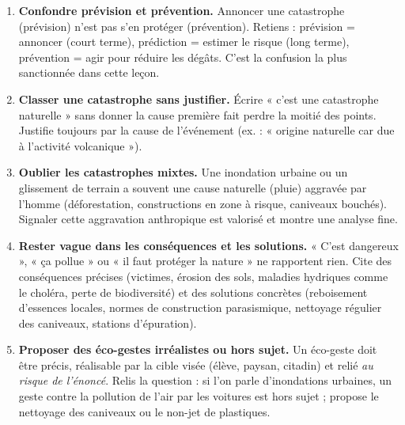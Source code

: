 \documentclass[11pt]{article}
\begin{document}
\begin{attention}
\begin{enumerate}
\item \textbf{Confondre prévision et prévention.} Annoncer une catastrophe (prévision) n'est pas s'en protéger (prévention). Retiens : prévision = annoncer (court terme), prédiction = estimer le risque (long terme), prévention = agir pour réduire les dégâts. C'est la confusion la plus sanctionnée dans cette leçon.
\item \textbf{Classer une catastrophe sans justifier.} Écrire « c'est une catastrophe naturelle » sans donner la cause première fait perdre la moitié des points. Justifie toujours par la cause de l'événement (ex. : « origine naturelle car due à l'activité volcanique »).
\item \textbf{Oublier les catastrophes mixtes.} Une inondation urbaine ou un glissement de terrain a souvent une cause naturelle (pluie) aggravée par l'homme (déforestation, constructions en zone à risque, caniveaux bouchés). Signaler cette aggravation anthropique est valorisé et montre une analyse fine.
\item \textbf{Rester vague dans les conséquences et les solutions.} « C'est dangereux », « ça pollue » ou « il faut protéger la nature » ne rapportent rien. Cite des conséquences précises (victimes, érosion des sols, maladies hydriques comme le choléra, perte de biodiversité) et des solutions concrètes (reboisement d'essences locales, normes de construction parasismique, nettoyage régulier des caniveaux, stations d'épuration).
\item \textbf{Proposer des éco-gestes irréalistes ou hors sujet.} Un éco-geste doit être précis, réalisable par la cible visée (élève, paysan, citadin) et relié \emph{au risque de l'énoncé}. Relis la question : si l'on parle d'inondations urbaines, un geste contre la pollution de l'air par les voitures est hors sujet ; propose le nettoyage des caniveaux ou le non-jet de plastiques.
\end{enumerate}
\end{attention}
\end{document}
